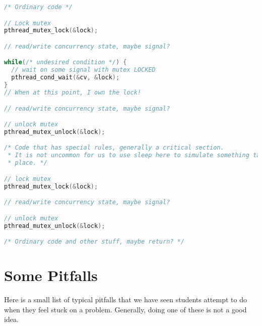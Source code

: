 \documentclass[11pt,usletter]{article}
\begin{document}
\begin{lstlisting}[style=netseclab,language=c]
/* Ordinary code */

// Lock mutex
pthread_mutex_lock(&lock);

// read/write concurrency state, maybe signal?

while(/* undesired condition */) {
  // wait on some signal with mutex LOCKED
  pthread_cond_wait(&cv, &lock);
}
// When at this point, I own the lock!

// read/write concurrency state, maybe signal?

// unlock mutex
pthread_mutex_unlock(&lock);

/* Code that has special rules, generally a critical section.
 * It is not uncommon for us to use sleep here to simulate something taking
 * place. */

// lock mutex
pthread_mutex_lock(&lock);

// read/write concurrency state, maybe signal?

// unlock mutex
pthread_mutex_unlock(&lock);

/* Ordinary code and other stuff, maybe return? */
\end{lstlisting}

\section{Some Pitfalls}

Here is a small list of typical pitfalls that we have seen students attempt to
do when they feel stuck on a problem. Generally, doing one of these is not a
good idea.
\end{document}
